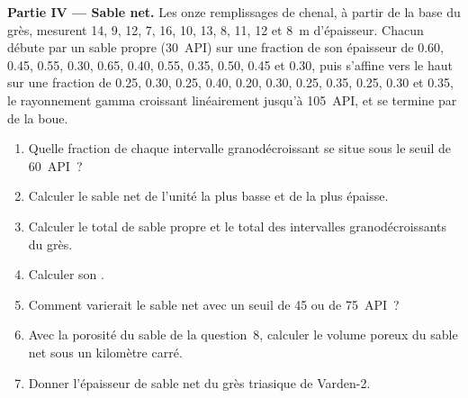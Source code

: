 \begin{problem}
\medskip\noindent\textbf{Partie IV --- Sable net.} Les onze remplissages de chenal,
à partir de la base du grès, mesurent 14, 9, 12, 7, 16, 10, 13, 8, 11, 12 et
\qty{8}{m} d'épaisseur. Chacun débute par un sable propre (\qty{30}{API}) sur une
fraction de son épaisseur de 0.60, 0.45, 0.55, 0.30, 0.65, 0.40, 0.55, 0.35, 0.50,
0.45 et 0.30, puis s'affine vers le haut sur une fraction de 0.25, 0.30, 0.25, 0.40,
0.20, 0.30, 0.25, 0.35, 0.25, 0.30 et 0.35, le rayonnement gamma croissant linéairement jusqu'à
\qty{105}{API}, et se termine par de la boue.
\begin{enumerate}[resume]
\item Quelle fraction de chaque intervalle granodécroissant se situe sous le
  seuil de \qty{60}{API}~?
\item Calculer le sable net de l'unité la plus basse et de la plus épaisse.
\item Calculer le total de sable propre et le total des intervalles granodécroissants du
  grès.
\item Calculer son .
\item Comment varierait le sable net avec un seuil de 45 ou de
  \qty{75}{API}~?
\item Avec la porosité du sable de la question~8, calculer le volume poreux du
  sable net sous un kilomètre carré.
\item Donner l'épaisseur de sable net du grès triasique de Varden-2.
\end{enumerate}
\end{problem}
